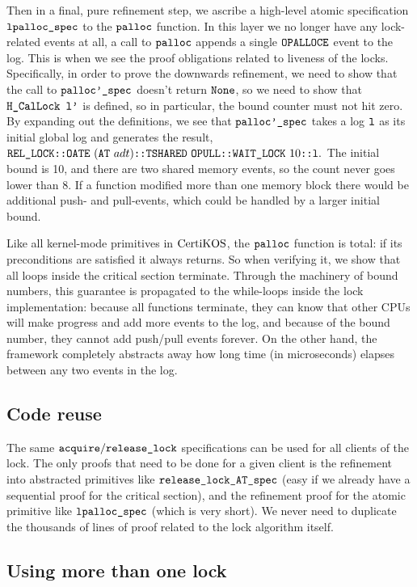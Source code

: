 Then in a final, pure refinement step, we ascribe a high-level atomic
specification ${\mathrm{\texttt{lpalloc\_spec}}}$ to the ${\mathrm{\texttt{palloc}}}$
function. In this layer we no longer have any lock-related events at
all, a call to ${\mathrm{\texttt{palloc}}}$ appends a single
${\mathrm{\texttt{OPALLOCE}}}$ event to the log. This is when we see the
proof obligations related to liveness of the locks.
Specifically, in order to prove the downwards refinement, we need to
show that the call to ${\mathrm{\texttt{palloc'\_spec}}}$ doesn't return
${\mathrm{\texttt{None}}}$, so we need to show that ${\mathrm{\texttt{H\_CalLock}}}{\mathrm{\texttt{ l'}}}$ is
defined, so in particular, the bound counter must not hit zero.
By expanding out the definitions, we see that
${\mathrm{\texttt{palloc'\_spec}}}$ takes a log ${\mathrm{\texttt{l}}}$ as its initial global log
and generates the result,
$\rellock\codeinmath{::}\mcsoateev{(\mcsalloctable\ adt)}\codeinmath{::} \mcstshared{\mcsopullev}\codeinmath{::}\waitlock{10}\codeinmath{::l}.$
The initial bound is 10, and there are two shared memory events, so the
count never goes lower than 8. If a function modified more than one
memory block there would be additional push- and pull-events, which
could be handled by a larger initial bound.

Like all kernel-mode primitives in $\mathrm{CertiKOS}$, the ${\mathrm{\texttt{palloc}}}$ function is
total: if its preconditions are satisfied it always returns. So
when verifying it, we show that all loops inside the critical section
terminate. Through the machinery of bound numbers, this guarantee is
propagated to the while-loops inside the lock implementation:
because all functions terminate, they can know that other CPUs will
make progress and add more events to the log, and because of the
bound number, they cannot add push/pull events forever. On the other
hand, the framework completely abstracts away how long time (in microseconds) elapses
between any two events in the log.

\subsection{Code reuse} 
The same
${\mathrm{\texttt{acquire}}}/{\mathrm{\texttt{release\_lock}}}$ specifications can be
used for all clients of the lock. The only proofs that need to be done
for a given client is the refinement into abstracted primitives like
${\mathrm{\texttt{release\_lock\_AT\_spec}}}$ (easy if we already have a sequential
proof for the critical section), and the refinement proof for the
atomic primitive like ${\mathrm{\texttt{lpalloc\_spec}}}$ (which is very
short). We never need to duplicate the thousands of lines of proof
related to the lock algorithm itself.

\subsection{Using more than one lock}

